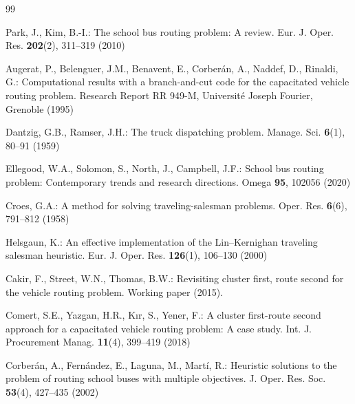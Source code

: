 %

{\footnotesize
\begin{thebibliography}{99}%
\setlength{\itemsep}{0pt}\setlength{\parskip}{0pt}\setlength{\parsep}{0pt}

Park, J., Kim, B.-I.: The school bus routing problem: A review. Eur. J. Oper. Res. \textbf{202}(2), 311--319 (2010)

Augerat, P., Belenguer, J.M., Benavent, E., Corber\'an, A., Naddef, D., Rinaldi, G.: Computational results with a branch-and-cut code for the capacitated vehicle routing problem. Research Report RR 949-M, Universit\'e Joseph Fourier, Grenoble (1995)

Dantzig, G.B., Ramser, J.H.: The truck dispatching problem. Manage. Sci. \textbf{6}(1), 80--91 (1959)

Ellegood, W.A., Solomon, S., North, J., Campbell, J.F.: School bus routing problem: Contemporary trends and research directions. Omega \textbf{95}, 102056 (2020)

Croes, G.A.: A method for solving traveling-salesman problems. Oper. Res. \textbf{6}(6), 791--812 (1958)

Helsgaun, K.: An effective implementation of the Lin--Kernighan traveling salesman heuristic. Eur. J. Oper. Res. \textbf{126}(1), 106--130 (2000)

Cakir, F., Street, W.N., Thomas, B.W.: Revisiting cluster first, route second for the vehicle routing problem. Working paper (2015).

Comert, S.E., Yazgan, H.R., K{\i}r, S., Yener, F.: A cluster first-route second approach for a capacitated vehicle routing problem: A case study. Int. J. Procurement Manag. \textbf{11}(4), 399--419 (2018)

Corberán, A., Fernández, E., Laguna, M., Martí, R.: Heuristic solutions to the problem of routing school buses with multiple objectives. J. Oper. Res. Soc. \textbf{53}(4), 427--435 (2002)


\end{thebibliography}}
